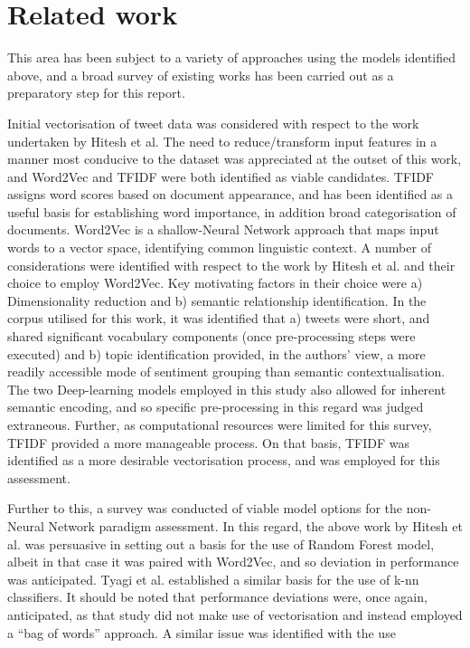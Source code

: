 \documentclass{article}
\begin{document}
\section{Related work}

This area has been subject to a variety of approaches using the models
identified above, and a broad survey of existing works has been carried out as a
preparatory step for this report.
\par
Initial vectorisation of tweet data was considered with respect to the work
undertaken by Hitesh et al. The need to reduce/transform input features in a
manner most conducive to the dataset was appreciated at the outset of this work,
and Word2Vec and TFIDF were both identified as viable candidates. TFIDF assigns
word scores based on document appearance, and has been identified as a useful
basis for establishing word importance, in addition broad categorisation of
documents. Word2Vec is a shallow-Neural Network approach that maps input words
to a vector space, identifying common linguistic context. A number of
considerations were identified with respect to the work by Hitesh et al. and
their choice to employ Word2Vec. Key motivating factors in their choice were a)
Dimensionality reduction and b) semantic relationship identification. In the
corpus utilised for this work, it was identified that a) tweets were short, and
shared significant vocabulary components (once pre-processing steps were
executed) and b) topic identification provided, in the authors’ view, a more
readily accessible mode of sentiment grouping than semantic contextualisation.
The two Deep-learning models employed in this study also allowed for inherent
semantic encoding, and so specific pre-processing in this regard was judged
extraneous. Further, as computational resources were limited for this survey,
TFIDF provided a more manageable process. On that basis, TFIDF was identified as
a more desirable vectorisation process, and was employed for this assessment.
\par
Further to this, a survey was conducted of viable model options for the
non-Neural Network paradigm assessment. In this regard, the above work by Hitesh
et al. was persuasive in setting out a basis for the use of Random Forest model,
albeit in that case it was paired with Word2Vec, and so deviation in performance
was anticipated. Tyagi et al. established a similar basis for the use of k-nn
classifiers. It should be noted that performance deviations were, once again,
anticipated, as that study did not make use of vectorisation and instead
employed a “bag of words” approach. A similar issue was identified with the use
\end{document}
